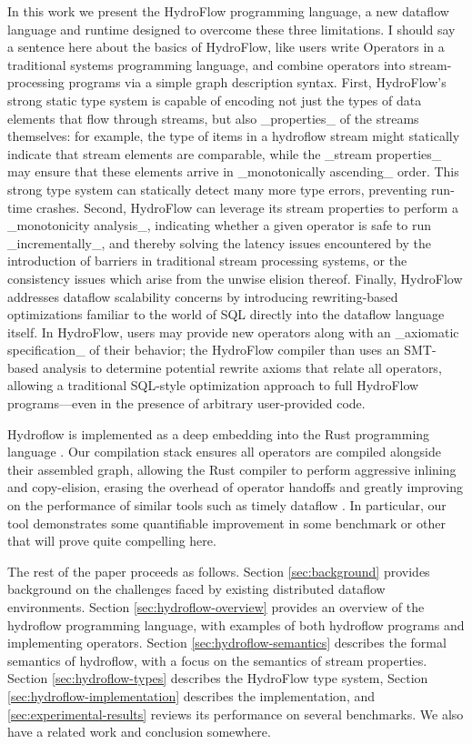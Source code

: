 In this work we present the HydroFlow programming language, a new dataflow language and runtime designed to overcome these three limitations. I should say a sentence here about the basics of HydroFlow, like users write Operators in a traditional systems programming language, and combine operators into stream-processing programs via a simple graph description syntax. First, HydroFlow's strong static type system is capable of encoding not just the types of data elements that flow through streams, but also _properties_ of the streams themselves: for example, the type of items in a hydroflow stream might statically indicate that stream elements are comparable, while the _stream properties_ may ensure that these elements arrive in _monotonically ascending_ order.  This strong type system can statically detect many more type errors, preventing run-time crashes. Second, HydroFlow can leverage its stream properties to perform a _monotonicity analysis_, indicating whether a given operator is safe to run _incrementally_, and thereby solving the latency issues encountered by the introduction of barriers in traditional stream processing systems, or the consistency issues which arise from the unwise elision thereof. Finally, HydroFlow addresses dataflow scalability concerns by introducing rewriting-based optimizations familiar to the world of SQL directly into the dataflow language itself. In HydroFlow, users may provide new operators along with an _axiomatic specification_ of their behavior; the HydroFlow compiler than uses an SMT-based analysis to determine potential rewrite axioms that relate all operators, allowing a traditional SQL-style optimization approach to full HydroFlow programs---even in the presence of arbitrary user-provided code.

Hydroflow is implemented as a deep embedding into the Rust programming language \cite{rust}.  Our compilation stack ensures all operators are compiled alongside their assembled graph, allowing the Rust compiler to perform aggressive inlining and copy-elision, erasing the overhead of  operator handoffs and greatly improving on the performance of similar tools such as timely dataflow \cite{timely-dataflow}.  In particular, our tool demonstrates some quantifiable improvement in some benchmark or other that will prove quite compelling here.

The rest of the paper proceeds as follows.  Section \ref{sec:background}
 provides background on the challenges faced by existing distributed dataflow environments. Section \ref{sec:hydroflow-overview} provides an overview of the hydroflow programming language, with examples of both hydroflow programs and implementing operators. Section \ref{sec:hydroflow-semantics} describes the formal semantics of hydroflow, with a focus on the semantics of stream properties. Section \ref{sec:hydroflow-types} describes the HydroFlow type system, Section \ref{sec:hydroflow-implementation} describes the implementation, and \ref{sec:experimental-results} reviews its performance on several benchmarks.  We also have a related work and conclusion somewhere. 

